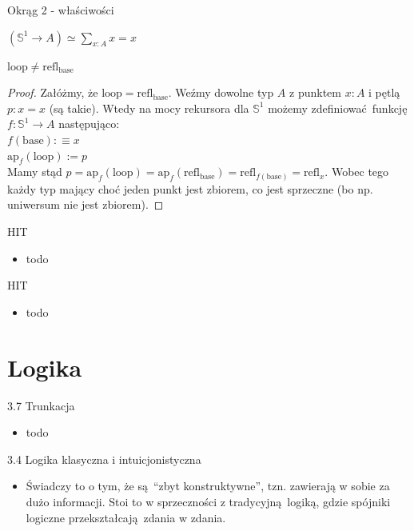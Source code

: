 \documentclass{beamer}
\newcommand{\defn}{:\equiv}
\newcommand{\refl}[1]{\text{refl}_{#1}}
\newcommand{\ap}[2]{\text{ap}_{#1}(#2)}
\newcommand{\hS}{\mathbb{S}^1}
\newcommand{\base}{\text{base}}
\newcommand{\looop}{\text{loop}}
\begin{document}
\begin{frame}{Okrąg 2 - właściwości}
	
\begin{theorem}
$(\hS \to A) \simeq \sum_{x : A} x = x$
\end{theorem}

\begin{theorem}[Lemat 6.4.1]
$\looop \neq \refl{\base}$
\end{theorem}
\begin{proof}
Załóżmy, że $\looop = \refl{\base}$. Weźmy dowolne typ $A$ z punktem $x : A$ i pętlą $p : x = x$ (są takie). Wtedy na mocy rekursora dla $\hS$ możemy zdefiniować funkcję $f : \hS \to A$ następująco: \\

$f(\base) \defn x$ \\
$\ap{f}{\looop} := p$ \\

Mamy stąd $p = \ap{f}{\looop} = \ap{f}{\refl{\base}} = \refl{f(\base)} = \refl{x}$. Wobec tego każdy typ mający choć jeden punkt jest zbiorem, co jest sprzeczne (bo np. uniwersum nie jest zbiorem).
\end{proof}

\end{frame}

\begin{frame}{HIT}
\begin{itemize}
	\item todo
\end{itemize}
\end{frame}

\begin{frame}{HIT}
\begin{itemize}
	\item todo
\end{itemize}
\end{frame}

\section{Logika}

\begin{frame}{3.7 Trunkacja}
\begin{itemize}
	\item todo
\end{itemize}
\end{frame}

\begin{frame}{3.4 Logika klasyczna i intuicjonistyczna}
\begin{itemize}
	\item  Świadczy to o tym, że są ``zbyt konstruktywne'', tzn. zawierają w sobie za dużo informacji. Stoi to w sprzeczności z tradycyjną logiką, gdzie spójniki logiczne przekształcają zdania w zdania.
\end{itemize}
\end{frame}
\end{document}
